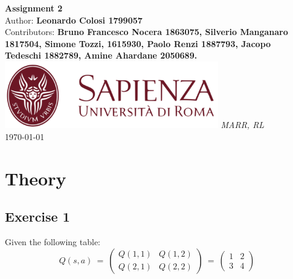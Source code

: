 \documentclass[10pt,a4paper]{article}
\begin{document}
\begin{titlepage}
    \begin{center}
        \vspace*{1cm}
        \Huge\textbf{Assignment 2}\\
        \vspace{1.5cm}
        \Large Author:
        \textbf{Leonardo Colosi 1799057}\\
        \vspace{0.5cm}
        \Large Contributors: \textbf{Bruno Francesco Nocera 1863075, Silverio Manganaro 1817504, Simone Tozzi, 1615930, Paolo Renzi 1887793, Jacopo Tedeschi 1882789, Amine Ahardane 2050689.}
        \vfill
        \includegraphics[width=0.7\textwidth]{images/sapienza_logo.png}
        \vfill
        \vspace{0.8cm}
        \Large \textit{MARR, RL}\\
        \today
    \end{center}
\end{titlepage}
\newpage

\tableofcontents
\newpage

\section{Theory}
\subsection{Exercise 1}
Given the following table:
\vspace{5pt}
\begin{equation*} 
    Q(s,a) \:=\:
    \begin{pmatrix}
        Q(1,1) & Q(1,2)\\
        Q(2,1) & Q(2,2)
    \end{pmatrix}
    \:=\: 
    \begin{pmatrix}
        1 & 2\\
        3 & 4
    \end{pmatrix}
\end{equation*}
\vspace{5pt}
\end{document}
